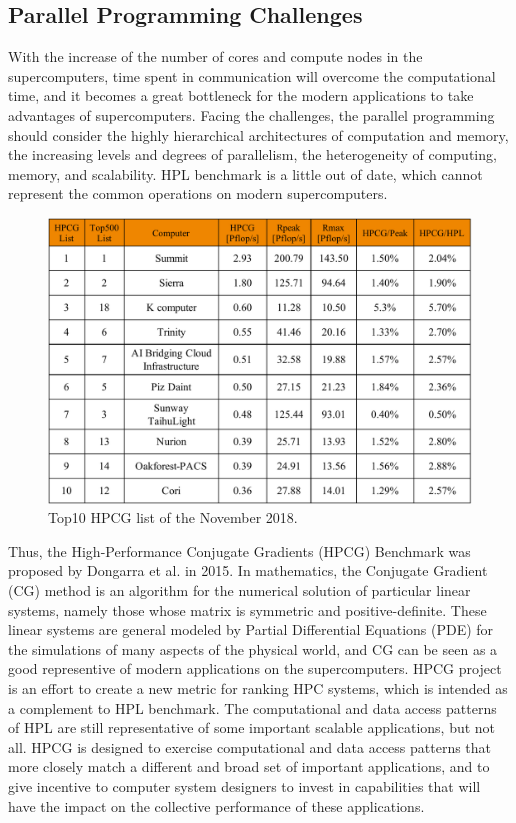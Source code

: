 \subsection{Parallel Programming Challenges} \label{Parallel Programming Challenges}

With the increase of the number of cores and compute nodes in the supercomputers, time spent in communication will overcome the computational time, and it becomes a great bottleneck for the modern applications to take advantages of supercomputers. Facing the challenges, the parallel programming should consider the highly hierarchical architectures of computation and memory, the increasing levels and degrees of parallelism, the heterogeneity of computing, memory, and scalability. HPL benchmark is a little out of date, which cannot represent the common operations on modern supercomputers.

\begin{figure}[htbp]
	\centering
	\includegraphics[width=0.99\linewidth]{fig/top500_hpcg.pdf}
	\caption{Top10 HPCG list of the November 2018.}
	\label{top500-hpxg}
\end{figure}

Thus, the High-Performance Conjugate Gradients (HPCG) Benchmark \cite{dongarra2015hpcg} was proposed by Dongarra et al. in 2015. In mathematics, the Conjugate Gradient (CG) method is an algorithm for the numerical solution of particular linear systems, namely those whose matrix is symmetric and positive-definite. These linear systems are general modeled  by Partial Differential Equations (PDE)  for the simulations of many aspects of the physical world, and CG can be seen as a good representive of modern applications on the supercomputers. HPCG project is an effort to create a new metric for ranking HPC systems, which is intended as a complement to HPL benchmark. The computational and data access patterns of HPL are still representative of some important scalable applications, but not all. HPCG is designed to exercise computational and data access patterns that more closely match a different and broad set of important applications, and to give incentive to computer system designers to invest in capabilities that will have the impact on the collective performance of these applications.

